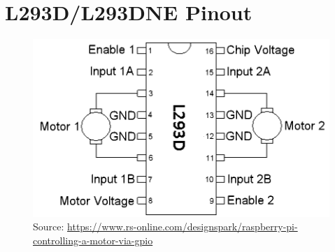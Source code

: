 \section{L293D/L293DNE Pinout}
	\label{sec:pinoutL293}
	\begin{figure}[h]
		\centering
		\includegraphics[width=0.9\linewidth]{sections/2_motor/pinout_L293DNE}
		\scriptsize
		\\ Source: \url{https://www.rs-online.com/designspark/raspberry-pi-controlling-a-motor-via-gpio}
		\normalsize
		\label{fig:pinoutL293}
	\end{figure}